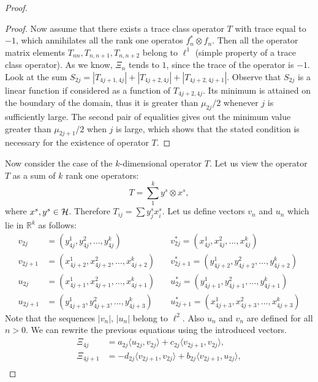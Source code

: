 \documentclass[12pt]{amsart}
\theoremstyle{case}
\begin{document}
\begin{proof}
\begin{proof}
      \medskip
      Now assume that there exists a trace class operator $T$ with trace equal to $-1$, which annihilates all the rank one operatos $f^*_n \otimes f_n$.
      Then all the operator matrix elements $T_{nn}, T_{n, n+1}, T_{n, n+2}$ belong to $\ell^1$ (simple property of a trace class operator).
      As we know, $\Xi_n$ tends to $1$, since the trace of the operator is $-1$.
      Look at the sum $S_{2j} = |T_{4j+1, 4j}| + |T_{4j+2,4j}| + |T_{4j+2,4j+1}|$.
      Observe that $S_{2j}$ is a linear function if considered as a function of $T_{4j+2, 4j}$.
      Its minimum is attained on the boundary of the domain, thus it is greater than $\mu_{2j}/2$ whenever $j$ is sufficiently large.
      The second pair of equalities gives out the minimum value greater than $\mu_{2j+1}/2$ when $j$ is large,
        which shows that the stated condition is necessary for the existence of operator $T$.
    \end{proof}
    Now consider the case of the $k$-dimensional operator $T$.
    Let us view the operator $T$ as a sum of $k$ rank one operators:
    \[
      T = \sum_1^k y^s \otimes x^s,
    \]
      where $x^s, y^s \in \cal{H}$.
    Therefore $T_{ij} = \sum {y^s_j x^s_i}$.
    Let us define vectors $v_n$ and $u_n$ which lie in $\mathbb{R}^k$ as follows:
    \begin{align*}
      v_{2j} &= (y^1_{4j}, y^2_{4j}, \dots ,y^k_{4j}) \quad
      &v^*_{2j} = (x^1_{4j}, x^2_{4j}, \dots ,x^k_{4j}) \\
      v_{2j+1} &= (x^1_{4j+2}, x^2_{4j+2}, \dots ,x^k_{4j+2}) \quad
      &v^*_{2j+1} = (y^1_{4j+2}, y^2_{4j+2}, \dots ,y^k_{4j+2}) \\
      u_{2j} &= (x^1_{4j+1}, x^2_{4j+1}, \dots ,x^k_{4j+1}) \quad
      &u^*_{2j} = (y^1_{4j+1}, y^2_{4j+1}, \dots ,y^k_{4j+1}) \\
      u_{2j+1} &= (y^1_{4j+3}, y^2_{4j+3}, \dots ,y^k_{4j+3}) \quad
      &u^*_{2j+1} = (x^1_{4j+3}, x^2_{4j+3}, \dots ,x^k_{4j+3}) 
    \end{align*}
    Note that the sequences $|v_n|$, $|u_n|$ belong to $\ell^2$. Also $u_n$ and $v_n$ are defined for all $n > 0$.
    We can rewrite the previous equations using the introduced vectors.
    \begin{align*}
      \Xi_{4j} &= a_{2j} \langle u_{2j}, v_{2j}\rangle + c_{2j} \langle v_{2j+1}, v_{2j}\rangle,\\
      \Xi_{4j + 1} &= -d_{2j} \langle v_{2j+1}, v_{2j}\rangle + b_{2j} \langle v_{2j+1}, u_{2j}\rangle,\\

\end{align*}
\end{proof}
\end{document}
